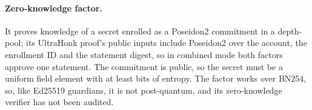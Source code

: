 \paragraph{Zero-knowledge factor.} It proves knowledge of a secret enrolled as a
Poseidon2 commitment in a depth- pool; its UltraHonk proof's
public inputs include Poseidon2 over the account, the enrollment ID and the
statement digest, so in combined mode both factors approve one statement. The
commitment is public, so the secret must be a uniform field element with at
least  bits of entropy. The factor works over BN254,
so, like Ed25519 guardians, it is not post-quantum, and its zero-knowledge
verifier has not been audited.

